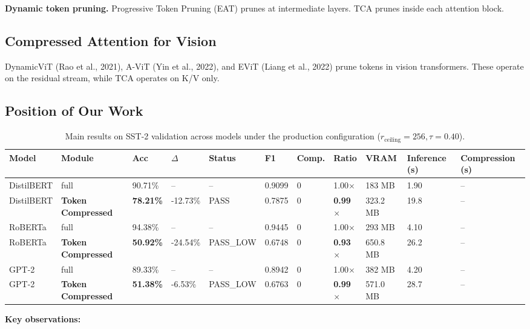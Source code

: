 \textbf{Dynamic token pruning.} Progressive Token Pruning (EAT) prunes at 
intermediate layers. TCA prunes inside each attention block.

\subsection{Compressed Attention for Vision}

DynamicViT (Rao et al., 2021), A-ViT (Yin et al., 2022), and EViT (Liang 
et al., 2022) prune tokens in vision transformers. These operate on the 
residual stream, while TCA operates on K/V only.

\subsection{Position of Our Work}

\begin{table}[t]
\centering
\small
\begin{tabular}{lllllllllll}
\toprule
\textbf{Model} & \textbf{Module} & \textbf{Acc} & \textbf{$\Delta$} & \textbf{Status} & \textbf{F1} & \textbf{Comp.} & \textbf{Ratio} & \textbf{VRAM} & \textbf{Inference (s)} & \textbf{Compression (s)} \\
\midrule
DistilBERT & full & 90.71\% & -- & -- & 0.9099 & 0 & 1.00$\times$ & 183 MB & 1.90 & -- \\
DistilBERT & \textbf{Token Compressed} & \textbf{78.21\%} & -12.73\% & PASS & 0.7875 & 0 & \textbf{0.99$\times$} & 323.2 MB & 19.8 & -- \\
RoBERTa & full & 94.38\% & -- & -- & 0.9445 & 0 & 1.00$\times$ & 293 MB & 4.10 & -- \\
RoBERTa & \textbf{Token Compressed} & \textbf{50.92\%} & -24.54\% & PASS_LOW & 0.6748 & 0 & \textbf{0.93$\times$} & 650.8 MB & 26.2 & -- \\
GPT-2 & full & 89.33\% & -- & -- & 0.8942 & 0 & 1.00$\times$ & 382 MB & 4.20 & -- \\
GPT-2 & \textbf{Token Compressed} & \textbf{51.38\%} & -6.53\% & PASS_LOW & 0.6763 & 0 & \textbf{0.99$\times$} & 571.0 MB & 28.7 & -- \\
\bottomrule
\end{tabular}
\caption{Main results on SST-2 validation across models under the production configuration ($r_{\mathrm{ceiling}}=256, \tau=0.40$).}
\label{tab:main_sst2}
\end{table}

\textbf{Key observations:}

